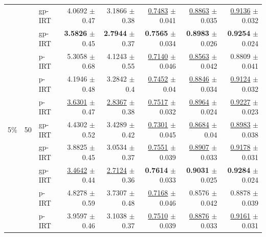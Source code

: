 \begin{longtable}{llp{}rrrrr}
 &  & gp-IRT & 4.0692 {\scriptsize $\pm$ 0.47} & 3.1866 {\scriptsize $\pm$ 0.38} & \underline{0.7483} {\scriptsize $\pm$ 0.041} & \underline{0.8863} {\scriptsize $\pm$ 0.035} & \underline{0.9136} {\scriptsize $\pm$ 0.032} \\
 &  & gp-IRT & \textbf{3.5826} {\scriptsize $\pm$ 0.45} & \textbf{2.7944} {\scriptsize $\pm$ 0.37} & \textbf{0.7565} {\scriptsize $\pm$ 0.034} & \textbf{0.8983} {\scriptsize $\pm$ 0.026} & \textbf{0.9254} {\scriptsize $\pm$ 0.024} \\
 &  & p-IRT & 5.3058 {\scriptsize $\pm$ 0.68} & 4.1243 {\scriptsize $\pm$ 0.55} & \underline{0.7140} {\scriptsize $\pm$ 0.046} & \underline{0.8563} {\scriptsize $\pm$ 0.042} & 0.8809 {\scriptsize $\pm$ 0.041} \\
 &  & p-IRT & 4.1946 {\scriptsize $\pm$ 0.48} & 3.2842 {\scriptsize $\pm$ 0.4} & \underline{0.7452} {\scriptsize $\pm$ 0.04} & \underline{0.8846} {\scriptsize $\pm$ 0.034} & \underline{0.9124} {\scriptsize $\pm$ 0.032} \\
 &  & p-IRT & \underline{3.6301} {\scriptsize $\pm$ 0.47} & \underline{2.8367} {\scriptsize $\pm$ 0.38} & \underline{0.7517} {\scriptsize $\pm$ 0.032} & \underline{0.8964} {\scriptsize $\pm$ 0.024} & \underline{0.9227} {\scriptsize $\pm$ 0.023} \\
\midrule
5\% & 50 & gp-IRT & 4.4302 {\scriptsize $\pm$ 0.52} & 3.4289 {\scriptsize $\pm$ 0.42} & \underline{0.7301} {\scriptsize $\pm$ 0.045} & \underline{0.8684} {\scriptsize $\pm$ 0.04} & \underline{0.8983} {\scriptsize $\pm$ 0.038} \\
 &  & gp-IRT & 3.8825 {\scriptsize $\pm$ 0.45} & 3.0534 {\scriptsize $\pm$ 0.37} & \underline{0.7551} {\scriptsize $\pm$ 0.039} & \underline{0.8907} {\scriptsize $\pm$ 0.033} & \underline{0.9178} {\scriptsize $\pm$ 0.031} \\
 &  & gp-IRT & \underline{3.4642} {\scriptsize $\pm$ 0.44} & \underline{2.7124} {\scriptsize $\pm$ 0.36} & \textbf{0.7614} {\scriptsize $\pm$ 0.033} & \textbf{0.9031} {\scriptsize $\pm$ 0.025} & \textbf{0.9284} {\scriptsize $\pm$ 0.024} \\
 &  & p-IRT & 4.8278 {\scriptsize $\pm$ 0.59} & 3.7307 {\scriptsize $\pm$ 0.48} & \underline{0.7168} {\scriptsize $\pm$ 0.046} & 0.8576 {\scriptsize $\pm$ 0.042} & 0.8878 {\scriptsize $\pm$ 0.039} \\
 &  & p-IRT & 3.9597 {\scriptsize $\pm$ 0.46} & 3.1038 {\scriptsize $\pm$ 0.37} & \underline{0.7510} {\scriptsize $\pm$ 0.039} & \underline{0.8876} {\scriptsize $\pm$ 0.033} & \underline{0.9161} {\scriptsize $\pm$ 0.031} \\

\end{longtable}
